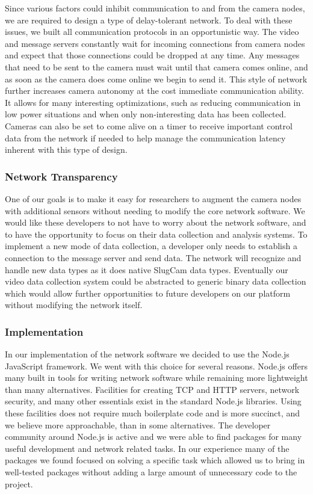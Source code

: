 Since various factors could inhibit communication to and from the camera nodes,
we are required to design a type of delay-tolerant network.  To deal with these
issues, we built all communication protocols in an opportunistic way. The video
and message servers constantly wait for incoming connections from camera nodes
and expect that those connections could be dropped at any time. Any messages
that need to be sent to the camera must wait until that camera comes online, and
as soon as the camera does come online we begin to send it. This style of
network further increases camera autonomy at the cost immediate communication
ability. It allows for many interesting optimizations, such as reducing
communication in low power situations and when only non-interesting data has
been collected. Cameras can also be set to come alive on a timer to receive
important control data from the network if needed to help manage the
communication latency inherent with this type of design.

\subsubsection{Network Transparency}

One of our goals is to make it easy for researchers to augment the camera nodes
with additional sensors without needing to modify the core network software. We
would like these developers to not have to worry about the network software, and
to have the opportunity to focus on their data collection and analysis systems.
To implement a new mode of data collection, a developer only needs to establish
a connection to the message server and send data. The network will recognize and
handle new data types as it does native SlugCam data types. Eventually our video
data collection system could be abstracted to generic binary data collection
which would allow further opportunities to future developers on our platform
without modifying the network itself.

\subsubsection{Implementation}

In our implementation of the network software we decided to use the Node.js
JavaScript framework. We went with this choice for several reasons. Node.js
offers many built in tools for writing network software while remaining more
lightweight than many alternatives. Facilities for creating TCP and HTTP
servers, network security, and many other essentials exist in the standard
Node.js libraries. Using these facilities does not require much boilerplate code
and is more succinct, and we believe more approachable, than in some
alternatives. The developer community around Node.js is active and we were able
to find packages for many useful development and network related tasks. In our
experience many of the packages we found focused on solving a specific task
which allowed us to bring in well-tested packages without adding a large amount
of unnecessary code to the project.

